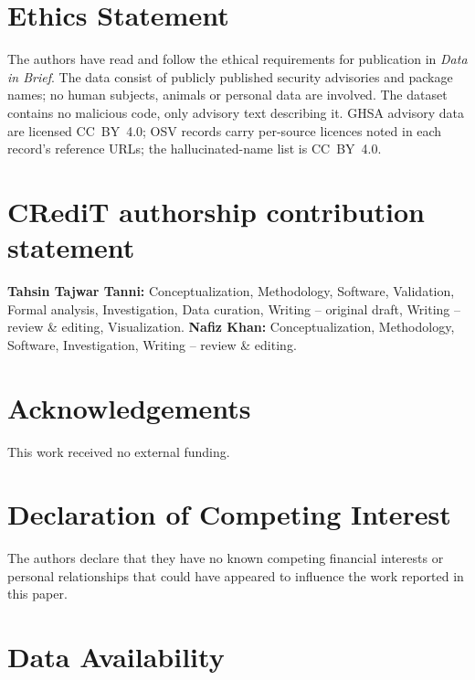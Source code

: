 \documentclass[preprint,12pt]{elsarticle}
\begin{document}
\section*{Ethics Statement}

The authors have read and follow the ethical requirements for publication in \emph{Data in Brief}. The data consist of publicly published security advisories and package names; no human subjects, animals or personal data are involved. The dataset contains no malicious code, only advisory text describing it. GHSA advisory data are licensed CC~BY~4.0; OSV records carry per-source licences noted in each record's reference URLs; the hallucinated-name list is CC~BY~4.0.

\section*{CRediT authorship contribution statement}

\textbf{Tahsin Tajwar Tanni:} Conceptualization, Methodology, Software, Validation, Formal analysis, Investigation, Data curation, Writing -- original draft, Writing -- review \& editing, Visualization. \textbf{Nafiz Khan:} Conceptualization, Methodology, Software, Investigation, Writing -- review \& editing. %

\section*{Acknowledgements}

This work received no external funding.

\section*{Declaration of Competing Interest}

The authors declare that they have no known competing financial interests or personal relationships that could have appeared to influence the work reported in this paper.

\section*{Data Availability}
\end{document}
